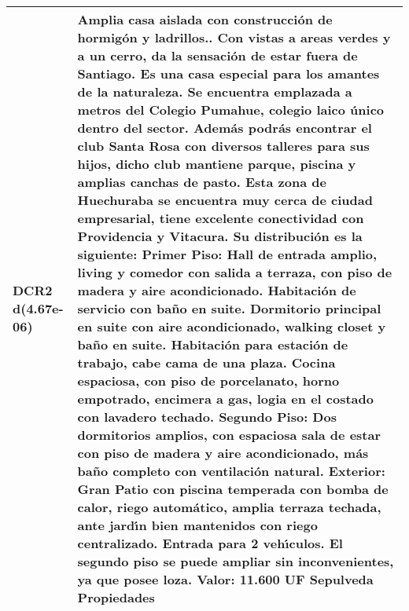 \begin{table}[H]
\begin{tabular}{|l|m{35em}|}
\hline DCR2 d(4.67e-06) & Amplia casa aislada con construcci\'on de hormig\'on y ladrillos.. Con vistas a areas verdes y a un cerro, da la sensaci\'on de estar fuera de Santiago. Es una casa especial para los amantes de la naturaleza. Se encuentra emplazada a metros del Colegio Pumahue, colegio laico \'unico dentro del sector. Adem\'as podr\'as encontrar el club Santa Rosa con diversos talleres para sus hijos, dicho club mantiene parque, piscina y amplias canchas de pasto. Esta zona de Huechuraba se encuentra muy cerca de ciudad empresarial, tiene excelente conectividad con Providencia y Vitacura.   Su distribuci\'on es la siguiente:  Primer Piso: Hall de entrada amplio, living y comedor con salida a terraza, con piso de madera y aire acondicionado. Habitaci\'on de servicio con ba\~no en suite. Dormitorio principal en suite con aire acondicionado, walking closet y ba\~no en suite. Habitaci\'on para estaci\'on de trabajo, cabe cama de una plaza.  Cocina espaciosa, con piso de porcelanato, horno empotrado, encimera a gas, logia en el costado con lavadero techado.  Segundo Piso: Dos dormitorios amplios, con espaciosa sala de estar con piso de madera y aire acondicionado, m\'as ba\~no completo con ventilaci\'on natural.  Exterior: Gran Patio con piscina temperada con bomba de calor, riego autom\'atico, amplia terraza techada, ante jard{\'\i}n bien mantenidos con riego centralizado. Entrada para 2 veh{\'\i}culos. El segundo piso se puede ampliar sin inconvenientes, ya que posee loza.  Valor: 11.600 UF  Sepulveda Propiedades \\
\hline
\end{tabular}
\end{table}
